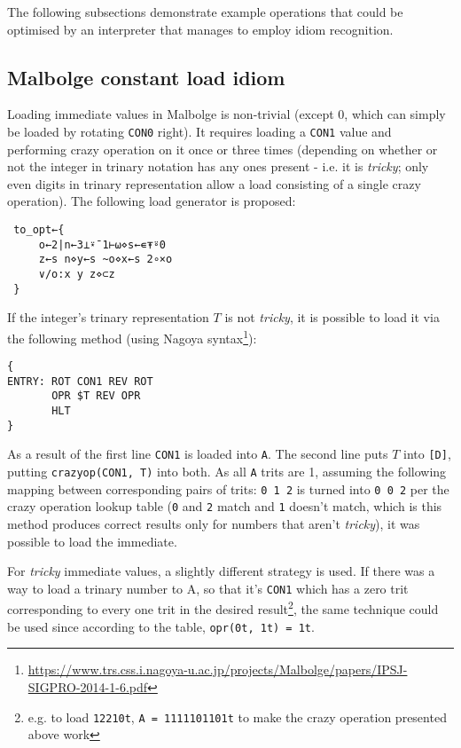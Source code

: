 \par The following subsections demonstrate example operations that could be optimised by an interpreter that manages to employ idiom recognition.

\subsection{Malbolge constant load idiom}

\par Loading immediate values in Malbolge is non-trivial (except 0, which can simply be loaded by rotating \verb|CON0| right). It requires loading a \verb|CON1| value and performing crazy operation on it once or three times (depending on whether or not the integer in trinary notation has any ones present - i.e. it is \textit{tricky}; only even digits in trinary representation allow a load consisting of a single crazy operation). The following load generator is proposed:

\begin{verbatim}
 to_opt←{
     o←2|n←3⊥⍣¯1⊢⍵⋄s←∊⍕⍤0
     z←s n⋄y←s ~o⋄x←s 2∘×o
     ∨/o:x y z⋄⊂z
 }
\end{verbatim}

\par If the integer's trinary representation $T$ is not \textit{tricky}, it is possible to load it via the following method (using Nagoya syntax\footnote{\url{https://www.trs.css.i.nagoya-u.ac.jp/projects/Malbolge/papers/IPSJ-SIGPRO-2014-1-6.pdf}}):

\begin{verbatim}
{
ENTRY: ROT CON1 REV ROT
       OPR $T REV OPR
       HLT
}
\end{verbatim}

\par As a result of the first line \verb|CON1| is loaded into \verb|A|. The second line puts $T$ into \verb|[D]|, putting \verb|crazyop(CON1, T)| into both. As all \verb|A| trits are 1, assuming the following mapping between corresponding pairs of trits: \verb|0 1 2| is turned into \verb|0 0 2| per the crazy operation lookup table (\verb|0| and \verb|2| match and \verb|1| doesn't match, which is this method produces correct results only for numbers that aren't \textit{tricky}), it was possible to load the immediate.

\par For \textit{tricky} immediate values, a slightly different strategy is used. If there was a way to load a trinary number to A, so that it's \verb|CON1| which has a zero trit corresponding to every one trit in the desired result\footnote{e.g. to load \verb|12210t|, \verb|A = 1111101101t| to make the crazy operation presented above work}, the same technique could be used since according to the table, \verb|opr(0t, 1t) = 1t|.

